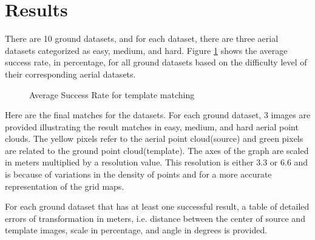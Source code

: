 \documentclass[11pt]{article}
\begin{document}
    \section{Results}
    There are 10 ground datasets, and for each dataset, there are three aerial datasets categorized as easy, medium,
    and hard. Figure \ref{fig:asr} shows the average success rate, in percentage, for all ground datasets based on the
    difficulty level of their corresponding aerial datasets.
    \begin{figure}
        \centering
        \label{fig:asr}
        \caption{Average Success Rate for template matching}
    \end{figure}

    Here are the final matches for the datasets. For each ground dataset, 3 images are provided illustrating the
    result matches in easy, medium, and hard aerial point clouds. The yellow pixels refer to the aerial point cloud(source)
    and green pixels are related to the ground point cloud(template). The axes of the graph are scaled in meters multiplied
    by a resolution value. This resolution is either 3.3 or 6.6 and is because of variations in the density of points
    and for a more accurate representation of the grid maps.

    For each ground dataset that has at least one successful result, a table of detailed errors of transformation
    in meters, i.e. distance between the center of source and template images, scale in percentage, and angle in
    degrees is provided.
\end{document}

